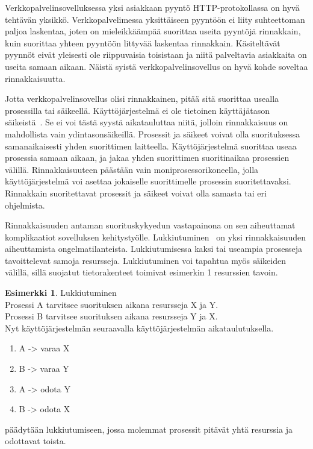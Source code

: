 \documentclass[finnish]{tktltiki2}%
\theoremstyle{definition}
\newtheorem{esim}[lau]{Esimerkki}
\theoremstyle{remark}
\begin{document}
Verkkopalvelinsovelluksessa yksi asiakkaan pyyntö HTTP-protokollassa 
on hyvä tehtävän yksikkö. Verkkopalvelimessa yksittäiseen
pyyntöön ei liity suhteettoman paljoa laskentaa, joten
on mieleikkäämpää suorittaa
useita pyyntöjä rinnakkain,
kuin suorittaa yhteen pyyntöön littyvää laskentaa rinnakkain.
Käsiteltävät pyynnöt eivät yleisesti ole riippuvaisia
toisistaan ja niitä palveltavia asiakkaita on useita
samaan aikaan.
Näistä syistä verkkopalvelinsovellus on hyvä kohde soveltaa rinnakkaisuutta.

Jotta verkkopalvelinsovellus olisi rinnakkainen, pitää sitä
suorittaa usealla prosessilla tai säikeellä.
Käyttöjärjestelmä ei ole tietoinen käyttäjätason säikeistä~\cite{stallings_operating_2018}.
Se ei voi tästä syystä aikatauluttaa niitä,
jolloin rinnakkaisuus on mahdollista
vain ydintasonsäikeillä.
Prosessit ja säikeet voivat olla suorituksessa samanaikaisesti
yhden suorittimen laitteella. Käyttöjärjestelmä suorittaa useaa prosessia
samaan aikaan, ja jakaa yhden suorittimen suoritinaikaa prosessien välillä.
Rinnakkaisuuteen päästään vain moniprosessorikoneella, jolla
käyttöjärjestelmä voi asettaa jokaiselle suorittimelle prosessin suoritettavaksi.
Rinnakkain suoritettavat prosessit ja säikeet voivat olla samasta tai
eri ohjelmista.

Rinnakkaisuuden antaman suorituskykyedun vastapainona
on sen aiheuttamat komplikaatiot sovelluksen kehitystyölle.
Lukkiutuminen~\cite{stallings_operating_2018}
on yksi rinnakkaisuuden aiheuttamista ongelmatilanteista.
Lukkiutumisessa kaksi tai useampia prosesseja tavoittelevat samoja resursseja.
Lukkiutuminen voi tapahtua myös säikeiden välillä, sillä
suojatut tietorakenteet toimivat esimerkin 1 resurssien tavoin.

\begin{center}
  \begin{esim}
    Lukkiutuminen \\
    Prosessi A tarvitsee suorituksen aikana resursseja X ja Y. \\
    Prosessi B tarvitsee suorituksen aikana resursseja Y ja X. \\
    Nyt käyttöjärjestelmän seuraavalla käyttöjärjestelmän aikataulutuksella.
    \begin{enumerate}
      \item A -> varaa X
      \item B -> varaa Y
      \item A -> odota Y
      \item B -> odota X
    \end{enumerate}
    päädytään lukkiutumiseen, jossa molemmat prosessit
    pitävät yhtä resurssia ja odottavat toista.
  \end{esim}
\end{center}
\end{document}
